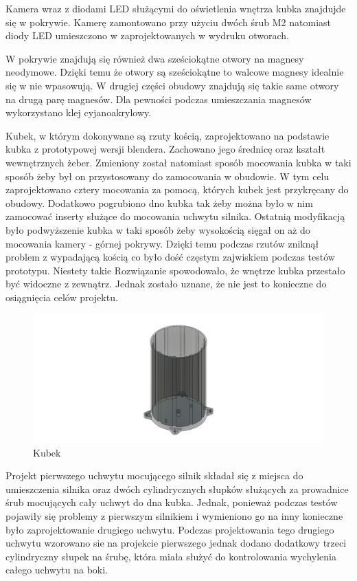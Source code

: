 Kamera wraz z diodami LED służącymi do oświetlenia wnętrza kubka znajdujde się w pokrywie. Kamerę zamontowano przy użyciu dwóch śrub M2 natomiast
diody LED umieszczono w zaprojektowanych w wydruku otworach.

W pokrywie znajdują się również dwa sześciokątne otwory na magnesy neodymowe. Dzięki temu że otwory są sześciokątne to walcowe magnesy idealnie
się w nie wpasowują. W drugiej części obudowy znajdują się takie same otwory na drugą parę magnesów. Dla pewności podczas umieszczania magnesów 
wykorzystano klej cyjanoakrylowy.

Kubek, w którym dokonywane są rzuty kością, zaprojektowano na podstawie kubka z prototypowej wersji blendera. Zachowano jego średnicę oraz kształt wewnętrznych
żeber. Zmieniony został natomiast sposób mocowania kubka w taki sposób żeby był on przystosowany do zamocowania w obudowie. W tym celu zaprojektowano
cztery mocowania za pomocą, których kubek jest przykręcany do obudowy. Dodatkowo pogrubiono dno kubka tak żeby można było w nim zamocować inserty służące 
do mocowania uchwytu silnika. Ostatnią modyfikacją było podwyższenie kubka w taki sposób żeby wysokością sięgał on aż do mocowania kamery - górnej pokrywy.
Dzięki temu podczas rzutów zniknął problem z wypadającą kością co było dość częstym zajwiskiem podczas testów prototypu. Niestety takie Rozwiązanie
spowodowało, że wnętrze kubka przestało być widoczne z zewnątrz. Jednak zostało uznane, że nie jest to konieczne do osiągnięcia celów projektu.

\begin{figure}[H]
    \centering
    \includegraphics[width=0.95\linewidth]{chapters/03-praca-wlasna/figures/kubek.png}
    \caption{\label{fig:kubek}Kubek}
\end{figure}

Projekt pierwszego uchwytu mocującego silnik składał się z miejsca do umieszczenia silnika oraz dwóch cylindrycznych słupków służących za prowadnice
śrub mocujących cały uchwyt do dna kubka. Jednak, ponieważ podczas testów pojawiły się problemy z pierwszym silnikiem i wymieniono go na inny konieczne
było zaprojektowanie drugiego uchwytu. Podczas projektowania tego drugiego uchwytu wzorowano sie na projekcie pierwszego jednak dodano dodatkowy trzeci
cylindryczny słupek na śrubę, która miała służyć do kontrolowania wychylenia całego uchwytu na boki. 

